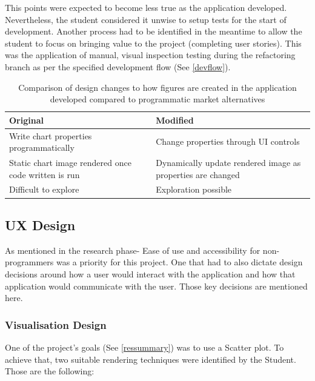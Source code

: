 This points were expected to become less true as the application developed. Nevertheless, the student considered it unwise to setup tests for the start of development. Another process had to be identified in the meantime to allow the student to focus on bringing value to the project (completing user stories). This was the application of manual, visual inspection testing during the refactoring branch as per the specified development flow (See \ref{devflow}).


\begin{table}[t]
    \begin{tabular}{ | l | l | }
        \hline
        Original                                             & Modified                                                    \\
        \hline
        Write chart properties programmatically              & Change properties through UI controls                       \\
        \hline
        Static chart image rendered once code written is run & Dynamically update rendered image as properties are changed \\
        \hline
        Difficult to explore                                 & Exploration possible                                        \\
        \hline
    \end{tabular}
    \caption{Comparison of design changes to how figures are created in the application developed compared to programmatic market alternatives}
    \label{compare}
\end{table}

\subsection{UX Design} \label{uxdesign}

As mentioned in the research phase- Ease of use and accessibility for non-programmers was a priority for this project. One that had to also dictate design decisions around how a user would interact with the application and how that application would communicate with the user. Those key decisions are mentioned here.

\subsubsection{Visualisation Design} \label{visdesign}
One of the project's goals (See \ref{ressummary}) was to use a Scatter plot. To achieve that, two suitable rendering techniques were identified by the Student. Those are the following:

